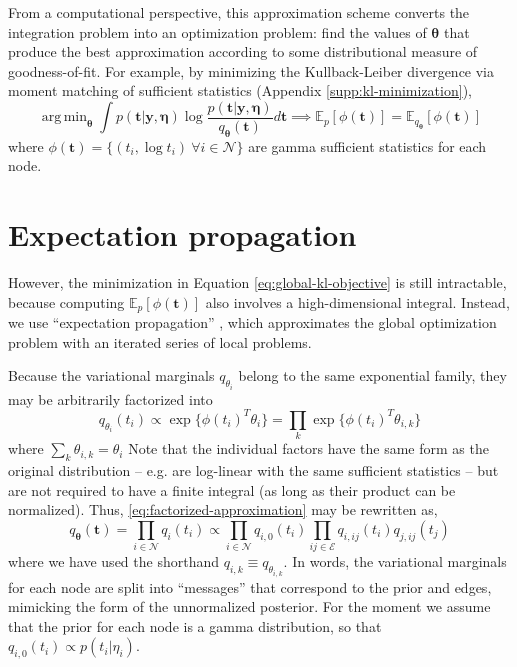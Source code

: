 \documentclass{article}
\DeclareMathOperator*{\argmin}{arg\,min}
\begin{document}
From a computational perspective, this approximation scheme converts the integration problem into an optimization problem: find the values of $\bm \theta$ that produce the best approximation according to some distributional measure of goodness-of-fit. For example, by minimizing the Kullback-Leiber divergence via moment matching of sufficient statistics (Appendix \ref{supp:kl-minimization}),
\begin{equation}
\label{eq:global-kl-objective}
\argmin_{\bm \theta} \int p(\bm t | \bm y , \bm \eta) \log \frac{p(\bm t | \bm y , \bm \eta)}{q_{\bm \theta}(\bm t)} d\bm t \implies \mathbb{E}_p[\phi(\bm t)] = \mathbb{E}_{q_{\bm \theta}}[\phi(\bm t)]
\end{equation}
where $\phi(\bm t) = \{(t_i, \log t_i)~\forall i \in \mathcal{N}\}$ are gamma sufficient statistics for each node.


\section{Expectation propagation}
\label{sec-exp-prop}

However, the minimization in Equation \ref{eq:global-kl-objective} is still intractable, because computing $\mathbb{E}_p[\phi(\bm t)]$ also involves a high-dimensional integral. Instead, we use ``expectation propagation'' \cite{minka2002expectation}, which approximates the global optimization problem with an iterated series of local problems.

Because the variational marginals $q_{\theta_i}$ belong to the same exponential family, they may be arbitrarily factorized into
\[
q_{\theta_i}(t_i) \propto \exp\{ \phi(t_i)^T \theta_i \} = \prod_k \exp\{\phi(t_i)^T \theta_{i,k}  \}    
\]
where $\sum_k \theta_{i,k} = \theta_i$ Note that the individual factors have the same form as the original distribution -- e.g. are log-linear with the same sufficient statistics -- but are not required to have a finite integral (as long as their product can be normalized). Thus, \ref{eq:factorized-approximation} may be rewritten as,
\[
q_{\bm \theta}(\bm t) = \prod_{i \in \mathcal{N}} q_i(t_i) \propto \prod_{i \in \mathcal{N}} q_{i,0}(t_i) \prod_{ij \in \mathcal{E}} q_{i,ij}(t_i) q_{j,ij}(t_j)
\]
where we have used the shorthand $q_{i,k} \equiv q_{\theta_{i,k}}$. In words, the variational marginals for each node are split into ``messages'' that correspond to the prior and edges, mimicking the form of the unnormalized posterior. For the moment we assume that the prior for each node is a gamma distribution, so that $q_{i,0}(t_i) \propto p(t_i | \eta_i)$. 
\end{document}
